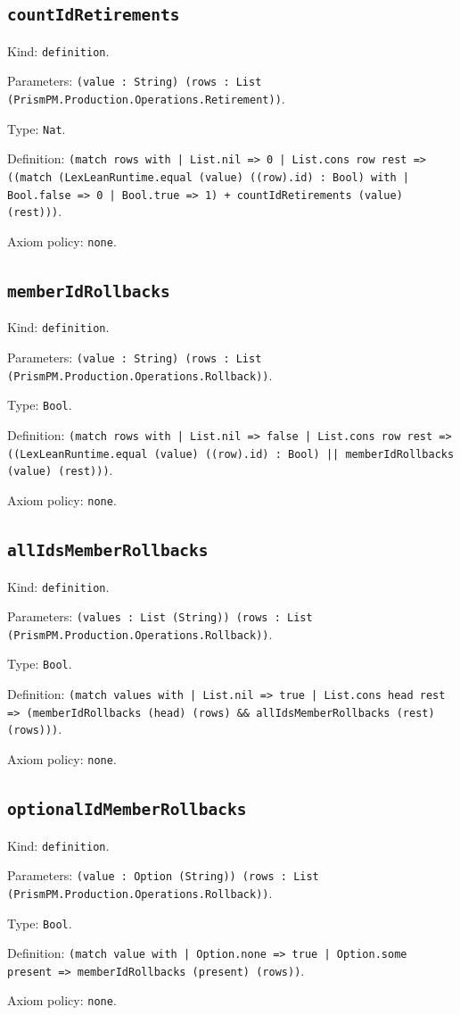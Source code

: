 \documentclass[11pt]{article}
\begin{document}
\subsection*{\texttt{countIdRetirements}}
\noindent Kind: \texttt{definition}.\par
\noindent Parameters: \texttt{(value : String) (rows : List (PrismPM.Production.Operations.Retirement))}.\par
\noindent Type: \texttt{Nat}.\par
\noindent Definition: \texttt{(match rows with | List.nil => 0 | List.cons row rest => ((match (LexLeanRuntime.equal (value) ((row).id) : Bool) with | Bool.false => 0 | Bool.true => 1) + countIdRetirements (value) (rest)))}.\par
\noindent Axiom policy: \texttt{none}.\par
\subsection*{\texttt{memberIdRollbacks}}
\noindent Kind: \texttt{definition}.\par
\noindent Parameters: \texttt{(value : String) (rows : List (PrismPM.Production.Operations.Rollback))}.\par
\noindent Type: \texttt{Bool}.\par
\noindent Definition: \texttt{(match rows with | List.nil => false | List.cons row rest => ((LexLeanRuntime.equal (value) ((row).id) : Bool) || memberIdRollbacks (value) (rest)))}.\par
\noindent Axiom policy: \texttt{none}.\par
\subsection*{\texttt{allIdsMemberRollbacks}}
\noindent Kind: \texttt{definition}.\par
\noindent Parameters: \texttt{(values : List (String)) (rows : List (PrismPM.Production.Operations.Rollback))}.\par
\noindent Type: \texttt{Bool}.\par
\noindent Definition: \texttt{(match values with | List.nil => true | List.cons head rest => (memberIdRollbacks (head) (rows) \&\& allIdsMemberRollbacks (rest) (rows)))}.\par
\noindent Axiom policy: \texttt{none}.\par
\subsection*{\texttt{optionalIdMemberRollbacks}}
\noindent Kind: \texttt{definition}.\par
\noindent Parameters: \texttt{(value : Option (String)) (rows : List (PrismPM.Production.Operations.Rollback))}.\par
\noindent Type: \texttt{Bool}.\par
\noindent Definition: \texttt{(match value with | Option.none => true | Option.some present => memberIdRollbacks (present) (rows))}.\par
\noindent Axiom policy: \texttt{none}.\par
\end{document}
